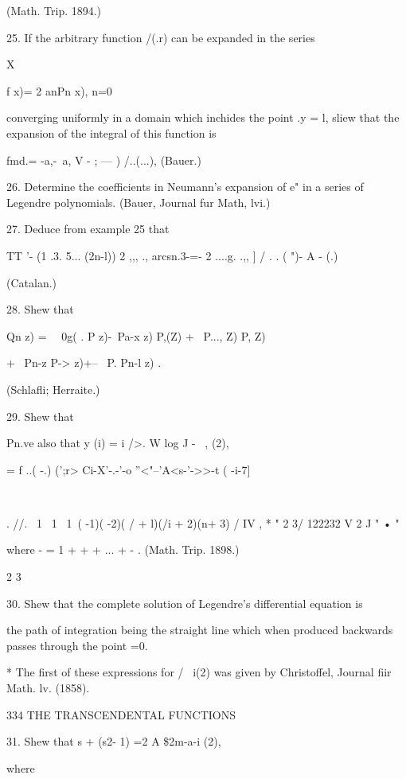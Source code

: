 {{{{(Math. Trip. 1894.) 

25. If the arbitrary function /(.r) can be expanded in the series 

X 

f x)= 2 anPn x), 
n=0 

converging uniformly in a domain which inchides the point .y = l, sliew that the expansion 
of the integral of this function is 

fmd.= -a,-\ a, V    - ; --- ) /..(...), (Bauer.) 

26. Determine the coefficients in Neumann's expansion of e"  in a series of Legendre 
polynomials. (Bauer, Journal fur Math, lvi.) 

27. Deduce from example 25 that 

TT '- (1 .3. 5... (2n-l)) 2 ,,, .,   
arcsn.3-=-  2    ....g. .,, ]  / .  . ( ")- A - (.)   

(Catalan.) 

28. Shew that 

Qn z) = \ \  0g(  . P  z)-\ Pa-x z) P,(Z) + \ P..., Z) P, Z) 

+ \ Pn-z  P-> z)+-- \ P.  Pn-l z)  . 

(Schlafli; Herraite.) 

29. Shew that 

Pn.ve also that y  (i) = i />. W log   J -  \  , (2), 

= f ..(  -.) (';r> Ci-X'-.-'-o ''<"--'A<s-'->>-t  ( -i-7] 



\ 



. //. \ 1 \ 1 \  1\  (  -1)( -2)( /  + l)(/i + 2)(n+ 3) / IV , 
  * " 2 3/ 122232 V 2 J " • " 



where  -  = 1 +  +   + ... + - . (Math. Trip. 1898.) 

2 3   

30. Shew that the complete solution of Legendre's differential equation is 

the path of integration being the straight line which when produced backwards passes 
through the point  =0. 

* The first of these expressions for / \ i(2) was given by Christoffel, Journal fiir Math. lv. 
(1858). 



334 THE TRANSCENDENTAL FUNCTIONS 

31. Shew that  s + (s2- 1) =2 A \$2m-a-i (2), 

where 

}}}}
